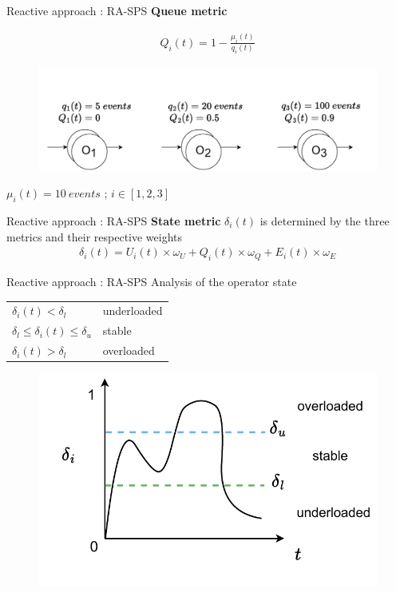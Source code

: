 \begin{frame}{Reactive approach : RA-SPS}
	\textbf{Queue metric}
	\begin{center}
	\begin{align*}
        Q_i(t) = 1-\frac{\mu_i(t)}{q_i(t)}
   	\end{align*}
   	\vspace*{-0.75cm}
   	\begin{figure}
   		\includegraphics[scale=0.5]{images/concepts/reactive/RA-SPS-Metric-Q.pdf}
   	\end{figure}
 	
  	$\mu_i(t) = 10~events$ ; $i \in [1,2,3]$
  	\end{center}
\end{frame}
	
\begin{frame}{Reactive approach : RA-SPS}
		\textbf{State metric} $\delta_i(t)$ is determined by the three metrics and their respective weights
        \begin{align*}
            \delta_i(t) = U_i(t) \times \omega_U + Q_i(t) \times \omega_Q + E_i(t) \times \omega_E
        \end{align*}   
\end{frame}
	
\begin{frame}{Reactive approach : RA-SPS}
	Analysis of the operator state
		
		\begin{tabular}{l l}
		$\delta_i(t) < \delta_l$ & underloaded \\
		$\delta_l \leq \delta_i(t) \leq \delta_u$ & stable \\
		$\delta_i(t) > \delta_l$ & overloaded
		\end{tabular}
	
	\begin{figure}
		\includegraphics[scale=0.6]{images/concepts/reactive/RA-SPS-Metric-Delta.pdf}
	\end{figure}
\end{frame}

